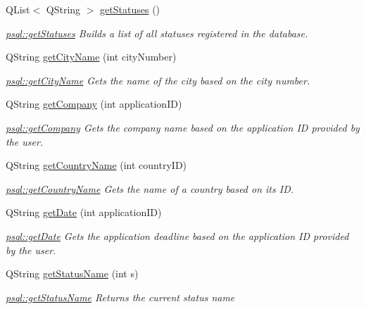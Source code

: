 \begin{DoxyCompactItemize}
Q\+List$<$ Q\+String $>$ \mbox{\hyperlink{classpsql_a14854d28aabc7e658aea87a7b8b52e5c}{get\+Statuses}} ()
\begin{DoxyCompactList}\small\item\em \mbox{\hyperlink{classpsql_a14854d28aabc7e658aea87a7b8b52e5c}{psql\+::get\+Statuses}} Builds a list of all statuses registered in the database. \end{DoxyCompactList}\item 
Q\+String \mbox{\hyperlink{classpsql_a7acc18034ef60c8a1e69b0e1a15d8ab2}{get\+City\+Name}} (int city\+Number)
\begin{DoxyCompactList}\small\item\em \mbox{\hyperlink{classpsql_a7acc18034ef60c8a1e69b0e1a15d8ab2}{psql\+::get\+City\+Name}} Gets the name of the city based on the city number. \end{DoxyCompactList}\item 
Q\+String \mbox{\hyperlink{classpsql_a09745cd03f09ffb2dacacaab4281915f}{get\+Company}} (int application\+ID)
\begin{DoxyCompactList}\small\item\em \mbox{\hyperlink{classpsql_a09745cd03f09ffb2dacacaab4281915f}{psql\+::get\+Company}} Gets the company name based on the application ID provided by the user. \end{DoxyCompactList}\item 
Q\+String \mbox{\hyperlink{classpsql_a5724e9992e6a5c98524ab73b98f4202d}{get\+Country\+Name}} (int country\+ID)
\begin{DoxyCompactList}\small\item\em \mbox{\hyperlink{classpsql_a5724e9992e6a5c98524ab73b98f4202d}{psql\+::get\+Country\+Name}} Gets the name of a country based on its ID. \end{DoxyCompactList}\item 
Q\+String \mbox{\hyperlink{classpsql_a561f96bfe7e9d092077712dd6b186af8}{get\+Date}} (int application\+ID)
\begin{DoxyCompactList}\small\item\em \mbox{\hyperlink{classpsql_a561f96bfe7e9d092077712dd6b186af8}{psql\+::get\+Date}} Gets the application deadline based on the application ID provided by the user. \end{DoxyCompactList}\item 
Q\+String \mbox{\hyperlink{classpsql_a5c2a64419a68a258071fd1f9a37c7c09}{get\+Status\+Name}} (int s)
\begin{DoxyCompactList}\small\item\em \mbox{\hyperlink{classpsql_a5c2a64419a68a258071fd1f9a37c7c09}{psql\+::get\+Status\+Name}} Returns the current status name \end{DoxyCompactList}\item 

\end{DoxyCompactItemize}
